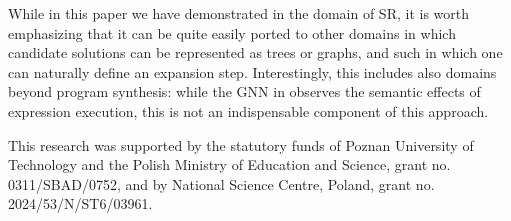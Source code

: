 While in this paper we have demonstrated \mname in the domain of SR, it is worth emphasizing that it can be quite easily ported to other domains in which candidate solutions can be represented as trees or graphs, and such in which one can naturally define an expansion step. Interestingly, this includes also domains beyond program synthesis: while the GNN in \mname observes the semantic effects of expression execution, this is not an indispensable component of this approach.  




\begin{acks}
  This research was supported by the statutory funds of Poznan University of Technology and the Polish Ministry of Education and Science, grant no. 0311/SBAD/0752, and by National Science Centre, Poland, grant no. 2024/53/N/ST6/03961.
\end{acks}

